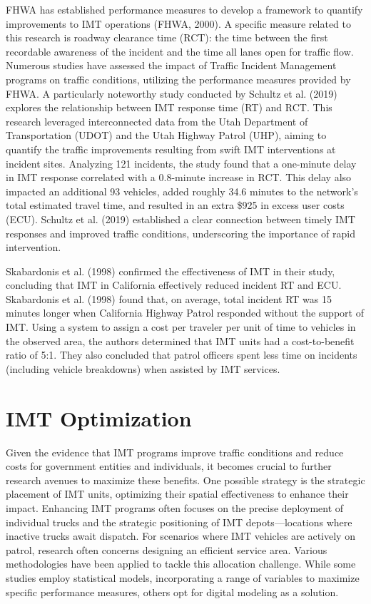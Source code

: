 \documentclass[fancy, oneside, mastersfancy, ms]{byuthesis}
\begin{document}
FHWA has established performance measures to develop a framework to
quantify improvements to IMT operations (FHWA, 2000). A specific measure
related to this research is roadway clearance time (RCT): the time
between the first recordable awareness of the incident and the time all
lanes open for traffic flow. Numerous studies have assessed the impact
of Traffic Incident Management programs on traffic conditions, utilizing
the performance measures provided by FHWA. A particularly noteworthy
study conducted by Schultz et al. (2019) explores the relationship
between IMT response time (RT) and RCT. This research leveraged
interconnected data from the Utah Department of Transportation (UDOT)
and the Utah Highway Patrol (UHP), aiming to quantify the traffic
improvements resulting from swift IMT interventions at incident sites.
Analyzing 121 incidents, the study found that a one-minute delay in IMT
response correlated with a 0.8-minute increase in RCT. This delay also
impacted an additional 93 vehicles, added roughly 34.6 minutes to the
network's total estimated travel time, and resulted in an extra \$925 in
excess user costs (ECU). Schultz et al. (2019) established a clear
connection between timely IMT responses and improved traffic conditions,
underscoring the importance of rapid intervention.

Skabardonis et al. (1998) confirmed the effectiveness of IMT in their
study, concluding that IMT in California effectively reduced incident RT
and ECU. Skabardonis et al. (1998) found that, on average, total
incident RT was 15 minutes longer when California Highway Patrol
responded without the support of IMT. Using a system to assign a cost
per traveler per unit of time to vehicles in the observed area, the
authors determined that IMT units had a cost-to-benefit ratio of 5:1.
They also concluded that patrol officers spent less time on incidents
(including vehicle breakdowns) when assisted by IMT services.

\hypertarget{sec-lit_imt_opt}{%
\section{IMT Optimization}\label{sec-lit_imt_opt}}

Given the evidence that IMT programs improve traffic conditions and
reduce costs for government entities and individuals, it becomes crucial
to further research avenues to maximize these benefits. One possible
strategy is the strategic placement of IMT units, optimizing their
spatial effectiveness to enhance their impact. Enhancing IMT programs
often focuses on the precise deployment of individual trucks and the
strategic positioning of IMT depots---locations where inactive trucks
await dispatch. For scenarios where IMT vehicles are actively on patrol,
research often concerns designing an efficient service area. Various
methodologies have been applied to tackle this allocation challenge.
While some studies employ statistical models, incorporating a range of
variables to maximize specific performance measures, others opt for
digital modeling as a solution.
\end{document}
